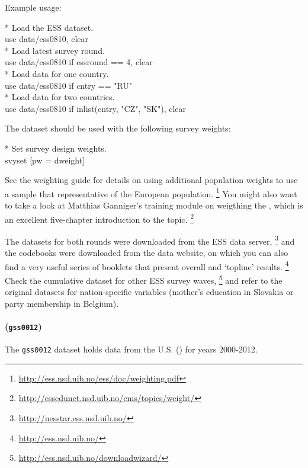 Example usage:

\begin{docspec}
  * Load the ESS dataset.\\%
  use data/ess0810, clear\\[1em]%
  * Load latest survey round.\\%
	use data/ess0810 if essround == 4, clear\\[1em]%
  * Load data for one country.\\%
  use data/ess0810 if cntry == "RU"\\[1em]%
  * Load data for two countries.\\%
	use data/ess0810 if inlist(cntry, "CZ", "SK"), clear
\end{docspec}

The \ESS dataset should be used with the following survey weights:

\begin{docspec}
  * Set survey design weights.\\%
	svyset [pw = dweight]
\end{docspec}

See the \ESS weighting guide for details on using additional population weights to use a sample that representative of the European population.%
  \footnote{\url{http://ess.nsd.uib.no/ess/doc/weighting.pdf}} %
  You might also want to take a look at Matthias Ganniger's training module on weigthing the \ESS, which is an excellent five-chapter introduction to the topic.%
  \footnote{\url{http://essedunet.nsd.uib.no/cms/topics/weight/}}

The datasets for both rounds were downloaded from the ESS data server,%
  \footnote{\url{http://nesstar.ess.nsd.uib.no/}} %
  and the codebooks were downloaded from the \ESS data website, on which you can also find a very useful series of booklets that present overall and `topline' results.%
  \footnote{\url{http://ess.nsd.uib.no/}} %
  Check the cumulative dataset for other ESS survey waves,%
  \footnote{\url{http://ess.nsd.uib.no/downloadwizard/}} %
  and refer to the original datasets for nation-specific variables (\eg mother's education in Slovakia or party membership in Belgium).

\paragraph{\gss (\texttt{gss0012})}

The \texttt{gss0012} dataset holds data from the U.S. \gss (\GSS) for years 2000-2012.

